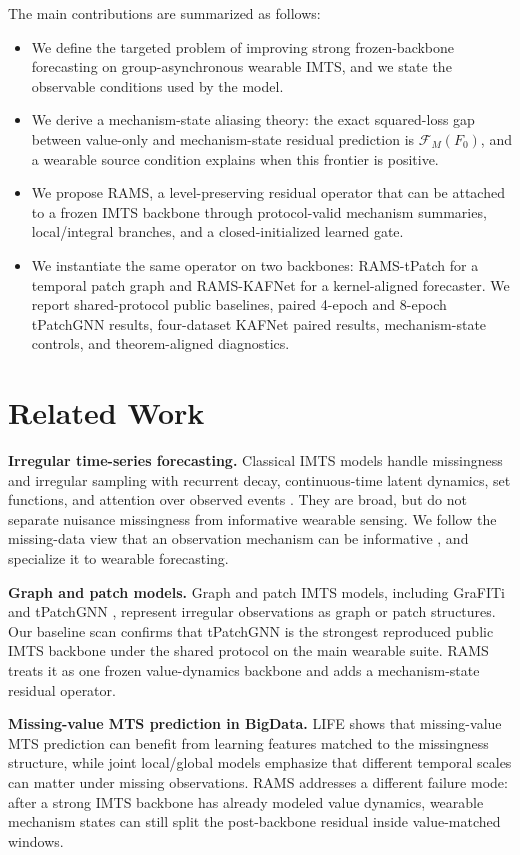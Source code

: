 ﻿\documentclass[10pt,conference]{IEEEtran}
\newcommand{\method}{\textnormal{\mbox{RAMS}}}
\newcommand{\tpatchinst}{\textnormal{\mbox{RAMS-tPatch}}}
\newcommand{\kafinst}{\textnormal{\mbox{RAMS-KAFNet}}}
\newcommand{\baseT}{\textnormal{\mbox{tPatchGNN}}}
\newcommand{\baseK}{\textnormal{\mbox{KAFNet}}}
\begin{document}
The main contributions are summarized as follows:
\begin{itemize}
\item We define the targeted problem of improving strong frozen-backbone
forecasting on group-asynchronous wearable IMTS, and we state the observable
conditions used by the model.
\item We derive a mechanism-state aliasing theory: the exact squared-loss gap
between value-only and mechanism-state residual prediction is
\(\mathcal{F}_M(F_0)\), and a wearable source condition explains when this
frontier is positive.
\item We propose \method{}, a level-preserving residual operator that can be
attached to a frozen IMTS backbone through protocol-valid mechanism summaries,
local/integral branches, and a closed-initialized learned gate.
\item We instantiate the same operator on two backbones: \tpatchinst{} for a
temporal patch graph and \kafinst{} for a kernel-aligned forecaster.  We report
shared-protocol public baselines, paired 4-epoch and 8-epoch \baseT{} results,
four-dataset \baseK{} paired results, mechanism-state controls, and
theorem-aligned diagnostics.
\end{itemize}

\section{Related Work}

\textbf{Irregular time-series forecasting.}
Classical IMTS models handle missingness and irregular sampling with recurrent
decay, continuous-time latent dynamics, set functions, and attention over
observed events \cite{grud,brits,latentode,seft,mtan}.  They are broad, but do
not separate nuisance missingness from informative wearable sensing.  We follow
the missing-data view that an observation mechanism can be informative
\cite{rubin}, and specialize it to wearable forecasting.

\textbf{Graph and patch models.}
Graph and patch IMTS models, including GraFITi and \baseT{}
\cite{grafiti,tpatchgnn}, represent irregular observations as graph or patch
structures.  Our baseline scan confirms that \baseT{} is the strongest
reproduced public IMTS backbone under the shared protocol on the main wearable
suite.  \method{} treats it as one frozen value-dynamics backbone and adds a
mechanism-state residual operator.

\textbf{Missing-value MTS prediction in BigData.}
LIFE \cite{life} shows that missing-value MTS prediction can benefit from
learning features matched to the missingness structure, while joint local/global
models \cite{jointlocalglobal} emphasize that different temporal scales can
matter under missing observations.  \method{} addresses a different failure
mode: after a strong IMTS backbone has already modeled value dynamics,
wearable mechanism states can still split the post-backbone residual inside
value-matched windows.
\end{document}
